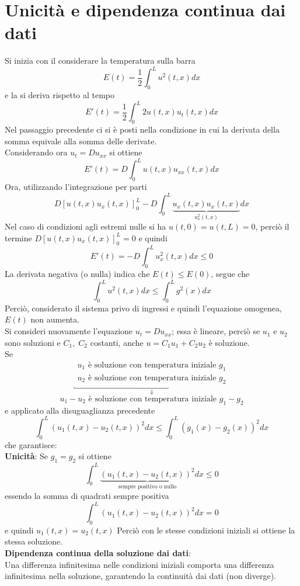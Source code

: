 \section{Unicit\`a e dipendenza continua dai dati}
Si inizia con il considerare la temperatura sulla barra
\[
	E(t)= \frac{1}{2}\int_0^L u^2 (t,x) dx
\]
e la si deriva rispetto al tempo
\[
	E'(t)= \frac{1}{2}\int_0^L 2u(t,x)u_t(t,x)dx
\]
Nel passaggio precedente ci si \`e posti nella condizione in cui la derivata
della somma equivale alla somma delle derivate.\\
Considerando ora $u_t=Du_{xx}$ si ottiene
\[
	E'(t)= D\int_0^L u(t,x)u_{xx}(t,x)dx
\]
Ora, utilizzando l'integrazione per parti
\[
	D\left[u(t,x)u_x(t,x)\right]_0^L - D\int_0^L
	\underbrace{u_x(t,x)u_x(t,x)}_{u_x^2(t,x)}dx
\]
Nel caso di condizioni agli estremi nulle si ha $u(t,0)=u(t,L)=0$, perci\`o il
termine $D\left[u(t,x)u_x(t,x)\right]_0^L=0$ e quindi
\[
	E'(t)= - D \int_0^L u_x^2(t,x) dx \leq 0
\]
La derivata negativa (o nulla) indica che $E(t)\leq E(0)$, segue che
\[
	\int_0^L u^2(t,x)dx \leq \int_0^L g^2 (x) dx
\]
Perci\`o, considerato il sistema privo di ingressi e quindi l'equazione
omogenea, $E(t)$ non aumenta. \\
Si consideri nuovamente l'equazione $u_t=Du_{xx}$; essa \`e lineare, perci\`o
se $u_1$ e $u_2$ sono soluzioni e $C_1,\; C_2$ costanti, anche $u=C_1u_1+C_2u_2$
\`e soluzione.\\
Se
\[
	\underbracket{
		\begin{array}{l}
			u_1 \text{ \`e soluzione con temperatura iniziale } g_1
\\
			u_2 \text{ \`e soluzione con temperatura iniziale } g_2
		\end{array}
		}_{\Downarrow}
\]
\[
	u_1-u_2 \text{ \`e soluzione con temperatura iniziale } g_1-g_2
\]
e applicato alla disuguaglianza precedente
\[
	\int_0^L \left(u_1(t,x)-u_2(t,x)\right)^2 dx
	\leq
	\int_0^L \left(g_1(x)-g_2(x)\right)^2 dx
\]
che garantisce:\\
{\bf Unicit\`a}: Se $g_1=g_2$ si ottiene
\[
	\int_0^L \underbrace{\left(u_1(t,x)-u_2(t,x)\right)^2}_\text{sempre
positivo o nullo} dx
	\leq 0
\]
essendo la somma di quadrati sempre positiva
\[
	\int_0^L \left(u_1(t,x)-u_2(t,x)\right)^2 dx
	= 0
\]
e quindi $u_1(t,x)=u_2(t,x)$
Perci\`o con le stesse condizioni iniziali si ottiene la stessa soluzione.\\
{\bf Dipendenza continua della soluzione dai dati}:\\
Una differenza infinitesima nelle condizioni iniziali comporta una differenza
infinitesima nella soluzione, garantendo la continuit\`a dai dati (non diverge).


